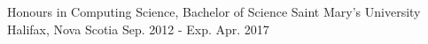 

\begin{cventries}

  \cventry
    {Honours in Computing Science, Bachelor of Science} %
    {Saint Mary's University} %
    {Halifax, Nova Scotia} %
    {Sep. 2012 - Exp. Apr. 2017} %
    {
    }

\end{cventries}
